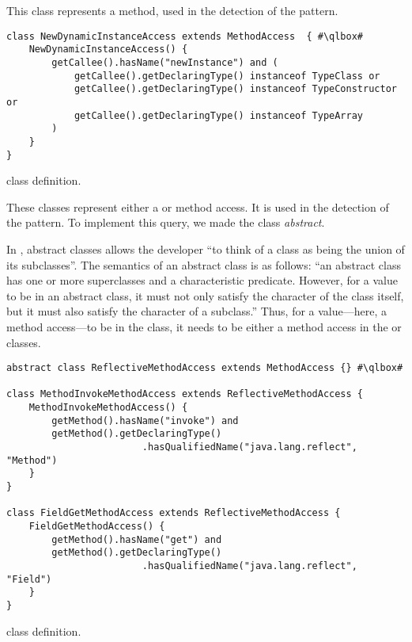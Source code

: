 This class represents a  method,
used in the detection of the  pattern.

\begin{listing}
\begin{verbatim}
class NewDynamicInstanceAccess extends MethodAccess  { #\qlbox#
	NewDynamicInstanceAccess() {
		getCallee().hasName("newInstance") and (
			getCallee().getDeclaringType() instanceof TypeClass or
			getCallee().getDeclaringType() instanceof TypeConstructor or
			getCallee().getDeclaringType() instanceof TypeArray
		)
	}
}
\end{verbatim}
\caption{ class definition.}
\label{lst:ql:NewDynamicInstanceAccess}
\end{listing}


These classes represent either a  or  method access.
It is used in the detection of the  pattern.
To implement this query, we made the  class 
\emph{abstract}.

In \ql{}, abstract classes allows the developer 
``to think of a class as being the union of its subclasses''.%
The semantics of an abstract class is as follows:
``an abstract class has one or more superclasses and a characteristic predicate.
However, for a value to be in an abstract class,
it must not only satisfy the character of the class itself,
but it must also satisfy the character of a subclass.''
Thus,
for a value---here, a method access---to be in the  class,
it needs to be either a method access in the  or  classes.

\begin{listing}
\begin{verbatim}
abstract class ReflectiveMethodAccess extends MethodAccess {} #\qlbox#

class MethodInvokeMethodAccess extends ReflectiveMethodAccess {
	MethodInvokeMethodAccess() {
		getMethod().hasName("invoke") and
		getMethod().getDeclaringType()
						.hasQualifiedName("java.lang.reflect", "Method")
	}
}

class FieldGetMethodAccess extends ReflectiveMethodAccess {
	FieldGetMethodAccess() {
		getMethod().hasName("get") and
		getMethod().getDeclaringType()
						.hasQualifiedName("java.lang.reflect", "Field")
	}
}
\end{verbatim}
\caption{ class definition.}
\label{lst:ql:ReflectiveMethodAccess}
\end{listing}

